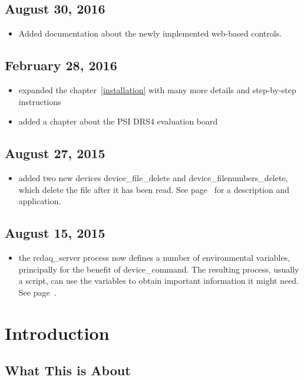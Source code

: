 \documentclass{article}[11pt]
\begin{document}
\subsection{August 30, 2016}
\begin{itemize}
\item Added documentation about the newly implemented web-based controls. 
\end{itemize}

\subsection{February 28, 2016}
\begin{itemize}
\item expanded the chapter~\ref{installation} with many more details
  and step-by-step instructions
\item  added a chapter about the PSI DRS4 evaluation board 
\end{itemize}

\subsection{August 27, 2015}
\begin{itemize}
\item  added two new devices device\_file\_delete and device\_filenumbers\_delete, which
  delete the file after it has been read. See page~\pageref{delete} for a description and application.
\end{itemize}

\subsection{August 15, 2015}
\begin{itemize}
\item the rcdaq\_server process now defines a number of environmental
  variables, principally for the benefit of  device\_command. The
  resulting process, usually a script, can use the variables to obtain important
  information it might need. See page~\pageref{environment}.
\end{itemize}

\newpage

\section{Introduction}


\subsection{What This is About}
\end{document}
